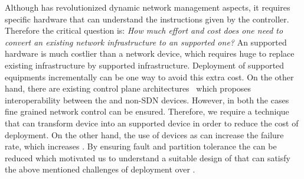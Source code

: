 Although  has revolutionized dynamic network management aspects, it requires specific hardware that can understand the instructions given by the  controller. Therefore the critical question is: {\em How much effort and cost does one need to convert an existing network infrastructure to an  supported one?} An  supported hardware is much costlier than a  network device, which requires huge  to replace existing infrastructure by  supported infrastructure. Deployment of  supported equipments incrementally can be one way to avoid this extra cost. On the other hand, there are existing  control plane architectures~\cite{sezer2013we,levin2013incremental,levin2014panopticon} which proposes interoperability between the  and non-SDN devices. However, in both the cases fine grained network control can be ensured. Therefore, we require a technique that can transform  device into an  supported  device in order to reduce the cost of deployment. On the other hand, the use of  devices as  can increase the failure rate, which increases . By ensuring fault and partition tolerance the  can be reduced which motivated us to understand a suitable design of  that can satisfy the above mentioned challenges of  deployment over .




